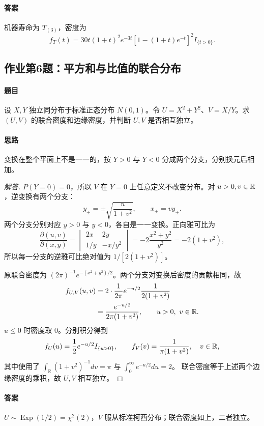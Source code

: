 \paragraph{答案}机器寿命为 $T_{(3)}$，密度为
\[
f_T(t)=30t(1+t)^2e^{-3t}[1-(1+t)e^{-t}]^2I_{\{t>0\}}.
\]

\subsection{作业第6题：平方和与比值的联合分布}\label{ex:w12-h6}
\paragraph{题目}
设 $X,Y$ 独立同分布于标准正态分布 $N(0,1)$。令 $U=X^2+Y^2$、$V=X/Y$。求 $(U,V)$ 的联合密度和边缘密度，并判断 $U,V$ 是否相互独立。
\paragraph{思路}变换在整个平面上不是一一的，按 $Y>0$ 与 $Y<0$ 分成两个分支，分别换元后相加。
\begin{proof}[解答]
$P(Y=0)=0$，所以 $V$ 在 $Y=0$ 上任意定义不改变分布。对 $u>0,v\in\mathbb R$，逆变换有两个分支：
\[
y_\pm=\pm\sqrt{\frac{u}{1+v^2}},\qquad x_\pm=vy_\pm.
\]
两个分支分别对应 $y>0$ 与 $y<0$，各自是一一变换。正向雅可比为
\[
\frac{\partial(u,v)}{\partial(x,y)}
=\begin{vmatrix}2x&2y\\1/y&-x/y^2\end{vmatrix}
=-2\frac{x^2+y^2}{y^2}=-2(1+v^2),
\]
所以每一分支的逆雅可比绝对值为 $1/[2(1+v^2)]$。

原联合密度为 $(2\pi)^{-1}e^{-(x^2+y^2)/2}$。两个分支对变换后密度的贡献相同，故
\begin{align*}
f_{U,V}(u,v)
&=2\cdot\frac1{2\pi}e^{-u/2}\frac1{2(1+v^2)}\\
&=\frac{e^{-u/2}}{2\pi(1+v^2)},\qquad u>0,\ v\in\mathbb R.
\end{align*}
$u\leq0$ 时密度取 $0$。分别积分得到
\[
f_U(u)=\frac12e^{-u/2}I_{\{u>0\}},\qquad
f_V(v)=\frac1{\pi(1+v^2)},\quad v\in\mathbb R,
\]
其中使用了 $\int_{\mathbb R}(1+v^2)^{-1}dv=\pi$ 与 $\int_0^\infty e^{-u/2}du=2$。
联合密度等于上述两个边缘密度的乘积，故 $U,V$ 相互独立。
\end{proof}
\paragraph{答案}$U\sim\operatorname{Exp}(1/2)=\chi^2(2)$，$V$ 服从标准柯西分布；联合密度如上，二者独立。

